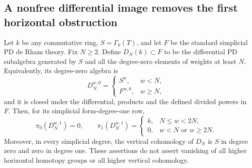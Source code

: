 \subsection{A nonfree differential image removes the first horizontal obstruction}

\begin{proposition}
\label{sa08:D027}
Let \(k\) be any commutative ring, \(S=\Gamma_k(T)\), and let
\(F\) be the standard simplicial PD de Rham theory. Fix \(N\ge2\).
Define \(D_N(k)\subset F\) to be the differential PD subalgebra
generated by \(S\) and all the degree-zero elements of weights
at least \(N\). Equivalently, its degree-zero algebra is
\[
 D_N^{w,0}=
 \begin{cases}S^w,&w<N,\\ F^{w,0},&w\ge N,\end{cases}
\]
and it is closed under the differential, products and the
defined divided powers in \(F\).
Then, for its simplicial form-degree-one row,
\[
 \pi_0(D_N^{w,1})=0,\qquad
 \pi_1(D_N^{w,1})=
 \begin{cases}
 k,&N\le w<2N,\\
 0,&w<N\text{ or }w\ge2N.
 \end{cases}
 \tag{D-27a}
\]
Moreover, in every simplicial degree, the vertical cohomology
of \(D_N\) is \(S\) in degree zero and zero in degree one.
These assertions do not assert vanishing of all higher
horizontal homotopy groups or all higher vertical cohomology.
\end{proposition}

